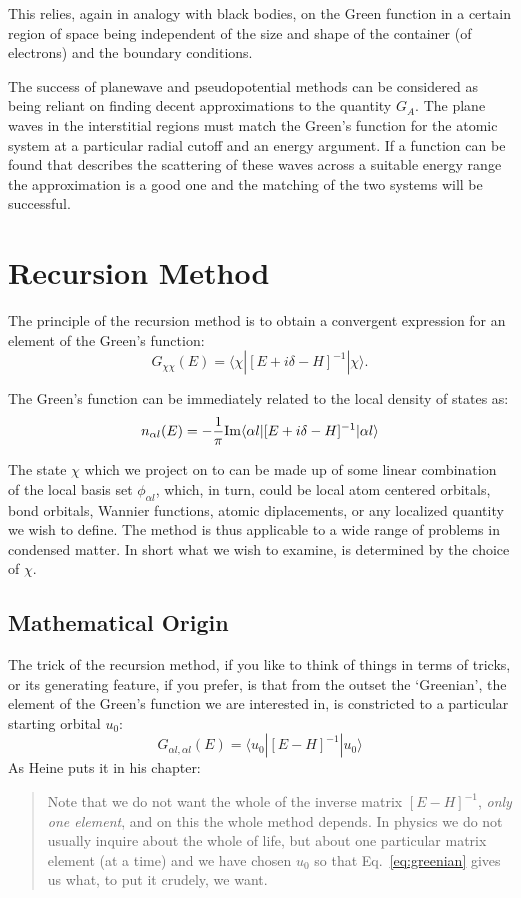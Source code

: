 \documentclass{article}
\def\ket{\rangle}
\def\bra{\langle}
\begin{document}
  This relies, again in analogy with black bodies, on the Green
function in a certain region of space being independent of the size and shape
of the container (of electrons) and the boundary conditions.

The success of planewave and pseudopotential methods can be considered as being reliant
on finding decent approximations to the quantity $G_{A}$. The plane waves
in the interstitial regions must match the Green's function for the atomic system
at a particular radial cutoff and an energy argument. If a function can be found that 
describes the scattering of these waves across a suitable energy range the approximation 
is a good one and the matching of the two systems will be successful.

\section{Recursion Method}
  The principle of the recursion method is to obtain a convergent expression 
for an element of the Green's function:
%
\begin{equation}
G_{\chi\chi}(E) = \bra\chi|[E + i\delta -H]^{-1}|\chi\ket.
\end{equation}
%

The Green's function can be immediately related to the local density of states as:
%
\begin{equation}
n_{\alpha l}(E) = -\frac{1}{\pi} {\rm Im}\bra\alpha l|[E + i\delta -H]^{-1}|\alpha l\ket
\end{equation}
%

The state $\chi$ which we project on to can be made up of some linear combination 
of the local basis set $\phi_{\alpha l}$, which, in turn, could be local atom centered orbitals, bond orbitals, 
Wannier functions, atomic diplacements, or any localized quantity we wish to define. The method is thus
applicable to a wide range of problems in condensed matter. In short what we wish to examine, 
is determined by the choice of $\chi$.

\subsection{Mathematical Origin}
The trick of the recursion method, if you like to think of things in terms of tricks, 
or its generating feature, if you prefer, is that from the outset the `Greenian', the element
of the Green's function we are interested in, is constricted to a particular starting orbital $u_{0}$: 
%
\begin{equation}
\label{eq:greenian}
G_{\alpha l, \alpha l}(E) = \bra u_{0}|[E-H]^{-1}|u_{0}\ket 
\end{equation}
%
As Heine puts it in his chapter:
%
\begin{quote}
Note that we do not want the whole of the inverse matrix $[E-H]^{-1}$, 
\emph{only one element}, and on this the whole method depends. In physics we do not
usually inquire about the whole of life, but about one particular matrix element (at a time) and we have chosen
$u_{0}$ so that Eq.~\ref{eq:greenian} gives us what, to put it crudely, we want.
\end{quote}
\end{document}
